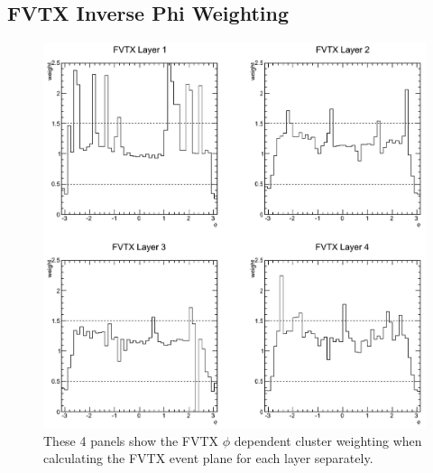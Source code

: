 \subsection{FVTX Inverse Phi Weighting}
\begin{figure}[h!]
\begin{center}
\includegraphics[width=0.55\linewidth]{figs/fvtx_weighting.png}
\caption{These 4 panels show the FVTX $\phi$ dependent cluster weighting when calculating the FVTX event plane for each layer separately. }
\label{fig:diagram2}
\end{center}
\end{figure}

